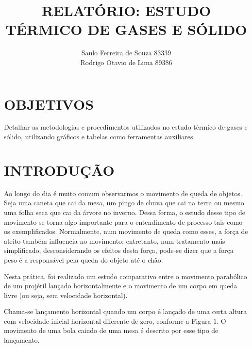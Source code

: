 \documentclass[10pt]{article}
\begin{document}
	

\title{\uppercase{\textbf{Relatório: Estudo térmico de gases e sólido}}}
\author{Saulo Ferreira de Souza 83339 \protect\\ Rodrigo Otavio de Lima 89386}
\maketitle

\setlength{\parindent}{2cm}

\section{OBJETIVOS}

Detalhar as metodologias e procedimentos utilizados no estudo térmico de gases e sólido, utilizando gráficos e tabelas como ferramentas auxiliares.

\section{INTRODUÇÃO}

Ao longo do dia é muito comum observarmos o movimento de queda de objetos. Seja uma caneta que cai da mesa, um pingo de chuva que cai na terra ou mesmo uma folha seca que cai da árvore no inverno. Dessa forma, o estudo desse tipo de movimento se torna algo importante para o  entendimento  de  processo tais  como os  exemplificados.  Normalmente,  num  movimento  de queda  como  esses,  a  força  de  atrito  também  influencia  no  movimento;  entretanto,  num  tratamento mais simplificado, desconsiderando os efeitos desta força, pode-se dizer que a força peso é a responsável pela queda do objeto até o chão. 

Nesta prática, foi realizado um estudo comparativo entre o movimento parabólico de um projétil lançado  horizontalmente  e o movimento de  um corpo em queda livre  (ou seja, sem velocidade horizontal).

Chama-se lançamento horizontal quando um corpo é lançado de uma certa altura com velocidade inicial horizontal diferente de  zero, conforme  a  Figura 1. O  movimento de  uma  bola  caindo de 
uma mesa é descrito por esse tipo de lançamento.
\end{document}
